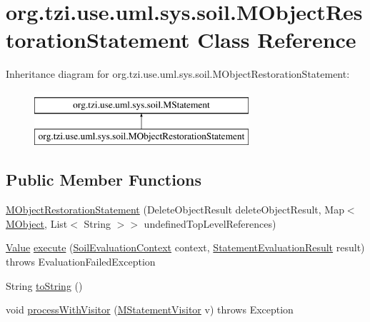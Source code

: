 \hypertarget{classorg_1_1tzi_1_1use_1_1uml_1_1sys_1_1soil_1_1_m_object_restoration_statement}{\section{org.\-tzi.\-use.\-uml.\-sys.\-soil.\-M\-Object\-Restoration\-Statement Class Reference}
\label{classorg_1_1tzi_1_1use_1_1uml_1_1sys_1_1soil_1_1_m_object_restoration_statement}
}
Inheritance diagram for org.\-tzi.\-use.\-uml.\-sys.\-soil.\-M\-Object\-Restoration\-Statement\-:\begin{figure}[H]
\begin{center}
\leavevmode
\includegraphics[height=2.000000cm]{classorg_1_1tzi_1_1use_1_1uml_1_1sys_1_1soil_1_1_m_object_restoration_statement}
\end{center}
\end{figure}
\subsection*{Public Member Functions}
\begin{DoxyCompactItemize}
\item 
\hyperlink{classorg_1_1tzi_1_1use_1_1uml_1_1sys_1_1soil_1_1_m_object_restoration_statement_a8c47e76a4b9ea49f9173eb6dbc69580a}{M\-Object\-Restoration\-Statement} (Delete\-Object\-Result delete\-Object\-Result, Map$<$ \hyperlink{interfaceorg_1_1tzi_1_1use_1_1uml_1_1sys_1_1_m_object}{M\-Object}, List$<$ String $>$$>$ undefined\-Top\-Level\-References)
\item 
\hyperlink{classorg_1_1tzi_1_1use_1_1uml_1_1ocl_1_1value_1_1_value}{Value} \hyperlink{classorg_1_1tzi_1_1use_1_1uml_1_1sys_1_1soil_1_1_m_object_restoration_statement_a9f48bffb721301c437cefb98fe535868}{execute} (\hyperlink{classorg_1_1tzi_1_1use_1_1uml_1_1sys_1_1soil_1_1_soil_evaluation_context}{Soil\-Evaluation\-Context} context, \hyperlink{classorg_1_1tzi_1_1use_1_1uml_1_1sys_1_1_statement_evaluation_result}{Statement\-Evaluation\-Result} result)  throws Evaluation\-Failed\-Exception 
\item 
String \hyperlink{classorg_1_1tzi_1_1use_1_1uml_1_1sys_1_1soil_1_1_m_object_restoration_statement_a10feeb88c962b5eee27a3744be846efb}{to\-String} ()
\item 
void \hyperlink{classorg_1_1tzi_1_1use_1_1uml_1_1sys_1_1soil_1_1_m_object_restoration_statement_a8a7a8f39944dd1b541cf705b9d1b5997}{process\-With\-Visitor} (\hyperlink{interfaceorg_1_1tzi_1_1use_1_1uml_1_1sys_1_1soil_1_1_m_statement_visitor}{M\-Statement\-Visitor} v)  throws Exception 
\end{DoxyCompactItemize}
